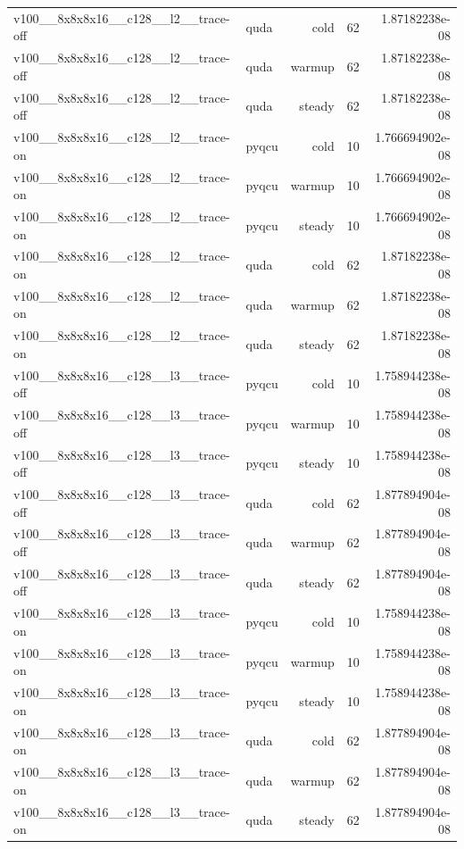 \begin{table}[htbp]
\begin{tabular}{@{}llrrr@{}}
v100\_\_8x8x8x16\_\_c128\_\_l2\_\_trace-off & quda & cold & 62 & 1.87182238e-08 \\
v100\_\_8x8x8x16\_\_c128\_\_l2\_\_trace-off & quda & warmup & 62 & 1.87182238e-08 \\
v100\_\_8x8x8x16\_\_c128\_\_l2\_\_trace-off & quda & steady & 62 & 1.87182238e-08 \\
v100\_\_8x8x8x16\_\_c128\_\_l2\_\_trace-on & pyqcu & cold & 10 & 1.766694902e-08 \\
v100\_\_8x8x8x16\_\_c128\_\_l2\_\_trace-on & pyqcu & warmup & 10 & 1.766694902e-08 \\
v100\_\_8x8x8x16\_\_c128\_\_l2\_\_trace-on & pyqcu & steady & 10 & 1.766694902e-08 \\
v100\_\_8x8x8x16\_\_c128\_\_l2\_\_trace-on & quda & cold & 62 & 1.87182238e-08 \\
v100\_\_8x8x8x16\_\_c128\_\_l2\_\_trace-on & quda & warmup & 62 & 1.87182238e-08 \\
v100\_\_8x8x8x16\_\_c128\_\_l2\_\_trace-on & quda & steady & 62 & 1.87182238e-08 \\
v100\_\_8x8x8x16\_\_c128\_\_l3\_\_trace-off & pyqcu & cold & 10 & 1.758944238e-08 \\
v100\_\_8x8x8x16\_\_c128\_\_l3\_\_trace-off & pyqcu & warmup & 10 & 1.758944238e-08 \\
v100\_\_8x8x8x16\_\_c128\_\_l3\_\_trace-off & pyqcu & steady & 10 & 1.758944238e-08 \\
v100\_\_8x8x8x16\_\_c128\_\_l3\_\_trace-off & quda & cold & 62 & 1.877894904e-08 \\
v100\_\_8x8x8x16\_\_c128\_\_l3\_\_trace-off & quda & warmup & 62 & 1.877894904e-08 \\
v100\_\_8x8x8x16\_\_c128\_\_l3\_\_trace-off & quda & steady & 62 & 1.877894904e-08 \\
v100\_\_8x8x8x16\_\_c128\_\_l3\_\_trace-on & pyqcu & cold & 10 & 1.758944238e-08 \\
v100\_\_8x8x8x16\_\_c128\_\_l3\_\_trace-on & pyqcu & warmup & 10 & 1.758944238e-08 \\
v100\_\_8x8x8x16\_\_c128\_\_l3\_\_trace-on & pyqcu & steady & 10 & 1.758944238e-08 \\
v100\_\_8x8x8x16\_\_c128\_\_l3\_\_trace-on & quda & cold & 62 & 1.877894904e-08 \\
v100\_\_8x8x8x16\_\_c128\_\_l3\_\_trace-on & quda & warmup & 62 & 1.877894904e-08 \\
v100\_\_8x8x8x16\_\_c128\_\_l3\_\_trace-on & quda & steady & 62 & 1.877894904e-08 \\

\end{tabular}
\end{table}
